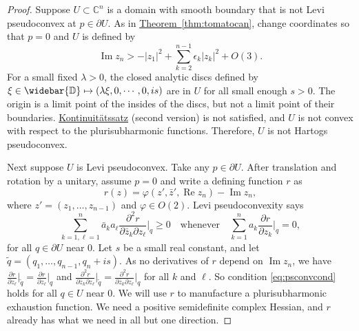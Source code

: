\documentclass[12pt,openany]{book}
\renewcommand{\Re}{\operatorname{Re}}
\renewcommand{\Im}{\operatorname{Im}}
\newcommand{\sabs}[1]{\lvert {#1} \rvert}
\newcommand{\C}{{\mathbb{C}}}
\newcommand{\D}{{\mathbb{D}}}
\theoremstyle{plain}
\theoremstyle{remark}
\theoremstyle{definition}
\theoremstyle{exercise}
\theoremstyle{example}
\newcommand{\thmref}[1]{\hyperref[#1]{Theorem~\ref*{#1}}}
\begin{document}
\begin{proof}
Suppose
$U \subset \C^n$ is a domain with smooth boundary that is not
Levi pseudoconvex at $p \in \partial U$.
As in
\thmref{thm:tomatocan}, change coordinates so that $p=0$ and $U$ is defined
by
\begin{equation*}
\Im z_n > - \sabs{z_1}^2 + \sum_{k=2}^{n-1} \epsilon_k \sabs{z_k}^2 + O(3) .
\end{equation*}
For a small fixed $\lambda > 0$, the
closed analytic discs defined by $\xi \in \widebar{\D} \mapsto (\lambda \xi, 0, \cdots, 0, is)$
are in $U$ for all small enough $s > 0$.  The origin
is a limit point of the insides of the discs, but not a limit point of their boundaries.
\hyperref[thm:contprinciple2]{Kontinuit\"atssatz} (second version) is not satisfied,
and $U$ is not
convex with respect to the plurisubharmonic functions.  Therefore,
$U$ is not Hartogs pseudoconvex.

Next suppose $U$ is Levi pseudoconvex.  Take any $p \in \partial U$.
After translation and rotation by a unitary, assume $p=0$ and
write a defining function $r$ as
\begin{equation*}
r(z) = \varphi(z',\bar{z}',\Re z_n) - \Im z_n ,
\end{equation*}
where $z' = (z_1,\ldots,z_{n-1})$ and $\varphi \in O(2)$.
Levi pseudoconvexity says
\begin{equation} \label{eq:psconvcond}
\sum_{k=1,\ell=1}^n
\bar{a}_k a_\ell \frac{\partial^2 r}{\partial \bar{z}_k \partial z_\ell} \Big|_q \geq 0
\quad \text{whenever} \quad
\sum_{k=1}^n
a_k \frac{\partial r}{\partial z_k} \Big|_q = 0 ,
\end{equation}
for all $q \in \partial U$ near $0$.
Let $s$ be a small real constant,
and let $\widetilde{q} = (q_1,\ldots,q_{n-1},q_n + is)$.
As no derivatives of $r$ depend on $\Im z_n$, we have
$\frac{\partial r}{\partial z_\ell} \big|_{\widetilde{q}} =
\frac{\partial r}{\partial z_\ell} \big|_{q}$ and
$\frac{\partial^2 r}{\partial \bar{z}_k \partial z_\ell} \big|_{\widetilde{q}} =
\frac{\partial^2 r}{\partial \bar{z}_k \partial z_\ell} \big|_{q}$
for all $k$ and $\ell$.
So condition \eqref{eq:psconvcond} holds for all $q \in U$ near $0$.
We will use $r$ to manufacture a plurisubharmonic exhaustion function.
We need a
positive semidefinite complex Hessian,
and $r$ already has what we need in all but one direction.


\end{proof}
\end{document}
